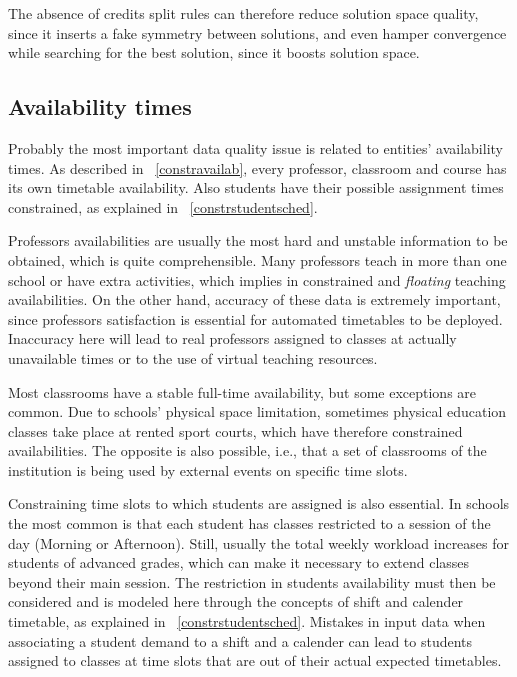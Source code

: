 The absence of credits split rules can therefore reduce solution space quality, since it inserts a fake symmetry between solutions, and even hamper convergence while searching for the best solution, since it boosts  solution space.


\subsection{Availability times}

Probably the most important data quality issue is related to entities' availability times. As described in ~\ref{constravailab}, every professor, classroom and course has its own timetable availability. Also students have their possible assignment times constrained, as explained in ~\ref{constrstudentsched}.

Professors availabilities are usually the most hard and unstable information to be obtained, which is quite comprehensible. Many professors teach in more than one school or have extra activities, which implies in constrained and \textit{floating} teaching availabilities. On the other hand, accuracy of these data is extremely important, since professors satisfaction is essential for automated timetables to be deployed. Inaccuracy here will lead to real professors assigned to classes at actually unavailable times or to the use of virtual teaching resources.

Most classrooms have a stable full-time availability, but some exceptions are common. Due to schools' physical space limitation, sometimes  physical education classes take place at rented sport courts, which have therefore constrained availabilities. The opposite is also possible, i.e., that a set of classrooms of the institution is being used by external events on specific time slots.


Constraining time slots to which students are assigned is also essential. In schools the most common is that each student has classes restricted to a session of the day (Morning or Afternoon). Still, usually the total weekly workload increases for students of advanced grades, which can make it necessary to extend classes beyond their main session. The restriction in students availability must then be considered and is modeled here through the concepts of shift and calender timetable, as explained in ~\ref{constrstudentsched}. Mistakes in input data when associating a student demand to a shift and a calender can lead to students assigned to classes at time slots that are out of their actual expected timetables.

